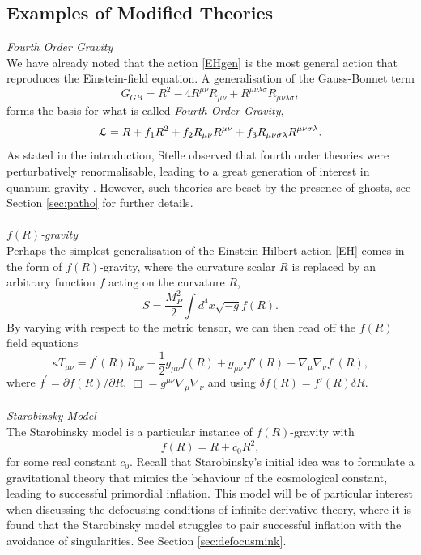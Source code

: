 \subsection*{Examples of Modified Theories}
\label{sec:Mod}
\emph{Fourth Order Gravity}\\
We have already noted that the action \eqref{EHgen} is the most general action that reproduces the Einstein-field equation. A generalisation of the Gauss-Bonnet term
\[
G_{GB}=R^2-4R^{\mu\nu}R_{\mu\nu}+R^{\mu\nu\lambda\sigma}R_{\mu\nu\lambda\sigma},
\]
forms the basis for what is called \emph{Fourth Order Gravity},
\[
{\cal L}=R+f_1 R^2 +f_2 R_{\mu\nu}R^{\mu\nu}+f_3 R_{\mu\nu\sigma\lambda}R^{\mu\nu\sigma\lambda}.
\]
As stated in the introduction, Stelle observed that fourth order theories were perturbatively renormalisable, leading to a great generation of interest in quantum gravity \cite{Stelle:1976gc}. However, such theories are beset by the presence of ghosts, see Section \ref{sec:patho} for further details.
\\\\\emph{$f(R)$-gravity}\\
Perhaps the simplest generalisation of the Einstein-Hilbert action \eqref{EH} comes in the form of $f(R)$-gravity, where the curvature scalar $R$ is replaced by an arbitrary function $f$ acting on the curvature $R$,
\[
S=\frac{M_P^2}{2}\int d^4x \sqrt{-g} f(R)
.\]
By varying with respect to the metric tensor, we can then read off the $f(R)$ field equations
\[
\kappa T_{\mu\nu}=f^{\prime}(R)R_{\mu\nu}-\frac{1}{2}g_{\mu\nu}f(R)+g_{\mu\nu}\square f'(R)-\nabla_{\mu}\nabla_{\nu}f^{\prime}(R),\]
where $f^{\prime}=\partial f(R)/\partial R$, $\Box=g^{\mu\nu}\nabla_\mu\nabla_\nu$ and using $\delta f(R)=f'(R)\delta R$.
\\\\ \emph{Starobinsky Model}\\
The Starobinsky model is a particular instance of $f(R)$-gravity with
\[
f(R)=R+c_0 R^2
,\]
for some real constant $c_0$. Recall that Starobinsky's initial idea was to formulate a gravitational theory that mimics the behaviour of the cosmological constant, leading to successful primordial inflation. This model will be of particular interest when discussing the defocusing conditions of infinite derivative theory, where it is found that the Starobinsky model struggles to pair successful inflation with the avoidance of singularities. See Section \ref{sec:defocusmink}.
